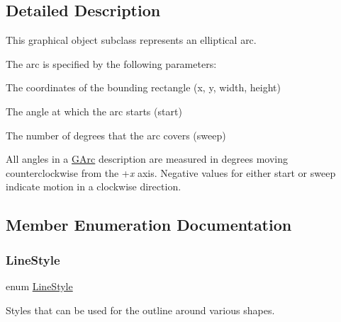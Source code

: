 \subsection{Detailed Description}
This graphical object subclass represents an elliptical arc. 

The arc is specified by the following parameters\+:


\begin{DoxyItemize}
\item The coordinates of the bounding rectangle ({\ttfamily x}, {\ttfamily y}, {\ttfamily width}, {\ttfamily height}) 
\item The angle at which the arc starts ({\ttfamily start}) 
\item The number of degrees that the arc covers ({\ttfamily sweep}) 
\end{DoxyItemize}

All angles in a {\ttfamily \mbox{\hyperlink{classsgl_1_1GArc}{G\+Arc}}} description are measured in degrees moving counterclockwise from the +{\itshape x} axis. Negative values for either {\ttfamily start} or {\ttfamily sweep} indicate motion in a clockwise direction.  

\subsection{Member Enumeration Documentation}
\mbox{\label{classsgl_1_1GObject_a86e0f5648542856159bb40775c854aa7}} 
\subsubsection{\texorpdfstring{Line\+Style}{LineStyle}}
{\footnotesize\ttfamily enum \mbox{\hyperlink{classsgl_1_1GObject_a86e0f5648542856159bb40775c854aa7}{Line\+Style}}\hspace{0.3cm}{\ttfamily [inherited]}}



Styles that can be used for the outline around various shapes. 

